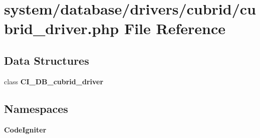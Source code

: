 \section{system/database/drivers/cubrid/cubrid\-\_\-driver.php File Reference}
\label{cubrid__driver_8php}
\subsection*{Data Structures}
\begin{DoxyCompactItemize}
\item 
class {\bf C\-I\-\_\-\-D\-B\-\_\-cubrid\-\_\-driver}
\end{DoxyCompactItemize}
\subsection*{Namespaces}
\begin{DoxyCompactItemize}
\item 
{\bf Code\-Igniter}
\end{DoxyCompactItemize}

